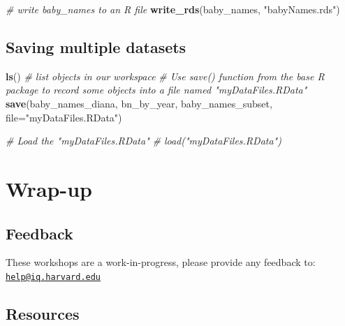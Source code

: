 \documentclass[
]{book}
\newenvironment{Shaded}{\begin{snugshade}}{\end{snugshade}}
\newcommand{\CommentTok}[1]{\textcolor[rgb]{0.56,0.35,0.01}{\textit{#1}}}
\newcommand{\DataTypeTok}[1]{\textcolor[rgb]{0.13,0.29,0.53}{#1}}
\newcommand{\KeywordTok}[1]{\textcolor[rgb]{0.13,0.29,0.53}{\textbf{#1}}}
\newcommand{\NormalTok}[1]{#1}
\newcommand{\StringTok}[1]{\textcolor[rgb]{0.31,0.60,0.02}{#1}}
\begin{document}
\begin{Shaded}
\begin{Highlighting}[]
\CommentTok{\# write baby\_names to an R file}
\KeywordTok{write\_rds}\NormalTok{(baby\_names, }\StringTok{"babyNames.rds"}\NormalTok{)}
\end{Highlighting}
\end{Shaded}

\hypertarget{saving-multiple-datasets}{%
\subsection{Saving multiple datasets}\label{saving-multiple-datasets}}

\begin{Shaded}
\begin{Highlighting}[]
\KeywordTok{ls}\NormalTok{() }\CommentTok{\# list objects in our workspace}
\CommentTok{\# Use save() function from the base R package to record some objects into a file named "myDataFiles.RData"}
\KeywordTok{save}\NormalTok{(baby\_names\_diana, bn\_by\_year, baby\_names\_subset, }\DataTypeTok{file=}\StringTok{"myDataFiles.RData"}\NormalTok{)  }
\end{Highlighting}
\end{Shaded}

\begin{Shaded}
\begin{Highlighting}[]
\CommentTok{\# Load the "myDataFiles.RData"}
\CommentTok{\# load("myDataFiles.RData") }
\end{Highlighting}
\end{Shaded}

\hypertarget{wrap-up-1}{%
\section{Wrap-up}\label{wrap-up-1}}

\hypertarget{feedback-1}{%
\subsection{Feedback}\label{feedback-1}}

These workshops are a work-in-progress, please provide any feedback to: \href{mailto:help@iq.harvard.edu}{\nolinkurl{help@iq.harvard.edu}}

\hypertarget{resources-2}{%
\subsection{Resources}\label{resources-2}}
\end{document}
